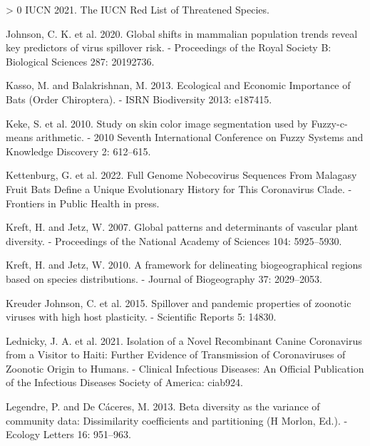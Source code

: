 \documentclass[11pt]{article}
\newlength{\cslhangindent}
\newenvironment{CSLReferences}[3] %
 {%
  \setlength{\parindent}{0pt}
  \ifodd #1 \everypar{\setlength{\hangindent}{\cslhangindent}}\ignorespaces\fi
  \ifnum #2 > 0
  \setlength{\parskip}{#2\baselineskip}
  \fi
 }%
 {}
\begin{document}
\begin{CSLReferences}{1}{0}
\leavevmode\hypertarget{ref-IUCN2021IucRed}{}%
IUCN 2021. The IUCN Red List of Threatened Species.

\leavevmode\hypertarget{ref-Johnson2020GloShi}{}%
Johnson, C. K. et al. 2020. Global shifts in mammalian population trends
reveal key predictors of virus spillover risk. - Proceedings of the
Royal Society B: Biological Sciences 287: 20192736.

\leavevmode\hypertarget{ref-Kasso2013EcoEco}{}%
Kasso, M. and Balakrishnan, M. 2013. Ecological and Economic Importance
of Bats (Order Chiroptera). - ISRN Biodiversity 2013: e187415.

\leavevmode\hypertarget{ref-Keke2010StuSki}{}%
Keke, S. et al. 2010. Study on skin color image segmentation used by
Fuzzy-c-means arithmetic. - 2010 Seventh International Conference on
Fuzzy Systems and Knowledge Discovery 2: 612--615.

\leavevmode\hypertarget{ref-Kettenburg2022FulGen}{}%
Kettenburg, G. et al. 2022. Full Genome Nobecovirus Sequences From
Malagasy Fruit Bats Define a Unique Evolutionary History for This
Coronavirus Clade. - Frontiers in Public Health in press.

\leavevmode\hypertarget{ref-Kreft2007GloPat}{}%
Kreft, H. and Jetz, W. 2007. Global patterns and determinants of
vascular plant diversity. - Proceedings of the National Academy of
Sciences 104: 5925--5930.

\leavevmode\hypertarget{ref-Kreft2010FraDel}{}%
Kreft, H. and Jetz, W. 2010. A framework for delineating biogeographical
regions based on species distributions. - Journal of Biogeography 37:
2029--2053.

\leavevmode\hypertarget{ref-KreuderJohnson2015SpiPan}{}%
Kreuder Johnson, C. et al. 2015. Spillover and pandemic properties of
zoonotic viruses with high host plasticity. - Scientific Reports 5:
14830.

\leavevmode\hypertarget{ref-Lednicky2021IsoNov}{}%
Lednicky, J. A. et al. 2021. Isolation of a Novel Recombinant Canine
Coronavirus from a Visitor to Haiti: Further Evidence of Transmission of
Coronaviruses of Zoonotic Origin to Humans. - Clinical Infectious
Diseases: An Official Publication of the Infectious Diseases Society of
America: ciab924.

\leavevmode\hypertarget{ref-Legendre2013BetDiv}{}%
Legendre, P. and De Cáceres, M. 2013. Beta diversity as the variance of
community data: Dissimilarity coefficients and partitioning (H Morlon,
Ed.). - Ecology Letters 16: 951--963.


\end{CSLReferences}
\end{document}
